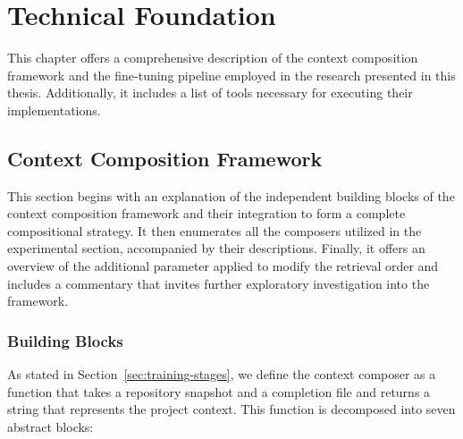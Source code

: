 \chapter{Technical Foundation}\label{chap:technical-foundation}  %

This chapter offers a comprehensive description of the context composition framework and the fine-tuning pipeline employed in the research presented in this thesis. Additionally, it includes a list of tools necessary for executing their implementations.

\section{Context Composition Framework}

This section begins with an explanation of the independent building blocks of the context composition framework and their integration to form a complete compositional strategy. It then enumerates all the composers utilized in the experimental section, accompanied by their descriptions. Finally, it offers an overview of the additional parameter applied to modify the retrieval order and includes a commentary that invites further exploratory investigation into the framework.

\subsection{Building Blocks}

As stated in Section~\ref{sec:training-stages}, we define the context composer as a function that takes a repository snapshot and a completion file and returns a string that represents the project context. This function is decomposed into seven abstract blocks:


